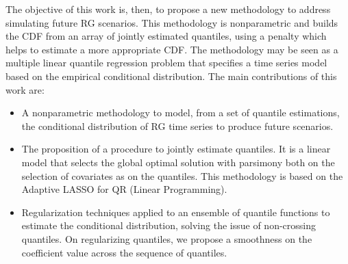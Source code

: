  
The objective of this work is, then, to propose a new methodology to address simulating future RG scenarios. This methodology is nonparametric and builds the CDF from an array of jointly estimated quantiles, using a penalty which helps to estimate a more appropriate CDF. The methodology may be seen as a multiple linear quantile regression problem that specifies a time series model based on the empirical conditional distribution. The main contributions of this work are:
\begin{itemize}
	\item A nonparametric methodology to model, from a set of quantile estimations, the conditional distribution of RG time series to produce future scenarios.
	
	\item The proposition of a procedure to jointly estimate quantiles. It is a linear model that selects the global optimal solution with parsimony both on the selection of covariates as on the quantiles. This methodology is based on the Adaptive LASSO for QR (Linear Programming). 
	
	\item Regularization techniques applied to an ensemble of quantile functions to estimate the conditional distribution, solving the issue of non-crossing quantiles. On regularizing quantiles, we propose a smoothness on the coefficient value across the sequence of quantiles.
	
\end{itemize}




